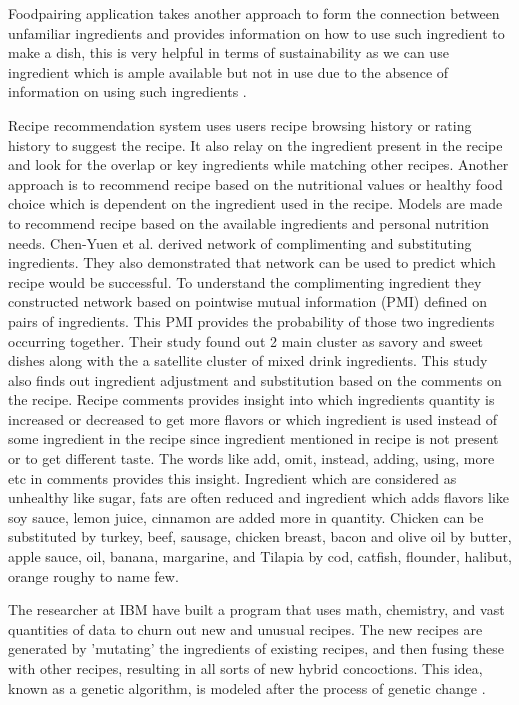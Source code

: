 \documentclass[sigconf]{acmart}
\begin{document}
Foodpairing application takes another approach to form the connection between unfamiliar ingredients and provides information on how to use such ingredient to make a dish, this is very helpful in terms of sustainability as we can use ingredient which is ample available but not in use due to the absence of information on using such ingredients \cite{www-foodtech}.

Recipe recommendation system uses users recipe browsing history or rating history to suggest the recipe. It also relay on the ingredient present in the recipe and look for the overlap or key ingredients while matching other recipes. Another approach is to recommend recipe based on the nutritional values or healthy food choice which is dependent on the ingredient used in the recipe. Models are made to recommend recipe based on the available ingredients and personal nutrition needs. Chen-Yuen et al. \cite{www-orxiv} derived network of complimenting and substituting ingredients. They also demonstrated that network can be used to predict which recipe would be successful. To understand the complimenting ingredient they constructed network based on pointwise mutual information (PMI) defined on pairs of ingredients. This PMI provides the probability of those two ingredients occurring together. Their study found out 2 main cluster as savory and sweet dishes along with the a satellite cluster of mixed drink ingredients. This study also finds out ingredient adjustment and substitution based on the comments on the recipe. Recipe comments provides insight into which ingredients quantity is  increased or decreased to get more flavors or which ingredient is used instead of some ingredient in the recipe since ingredient mentioned in recipe is not present or to get different taste. The words like add, omit, instead, adding, using, more etc in comments provides this insight. Ingredient which are considered as unhealthy like sugar, fats are often reduced and ingredient which adds flavors like soy sauce, lemon juice, cinnamon are added more in quantity. Chicken can be substituted by turkey, beef, sausage, chicken breast, bacon and olive oil by butter, apple sauce, oil, banana, margarine, and Tilapia by cod, catfish, flounder, halibut, orange roughy to name few.

The researcher at IBM have built a program that uses math, chemistry, and vast quantities of data to churn out new and unusual recipes. The new recipes are generated by 'mutating' the ingredients of existing recipes, and then fusing these with other recipes, resulting in all sorts of new hybrid concoctions. This idea, known as a genetic algorithm, is modeled after the process of genetic change \cite{www-wired}.
\end{document}
